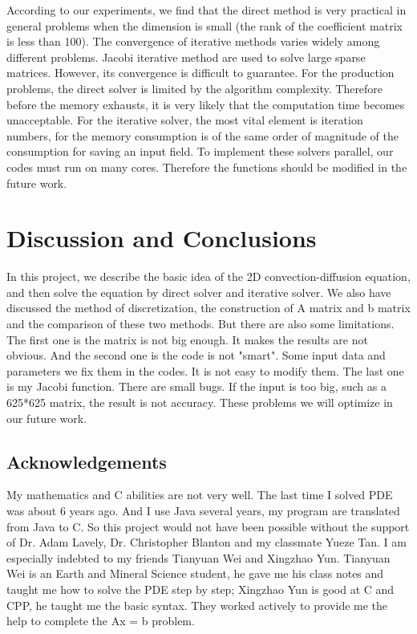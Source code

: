 \documentclass{article}
\begin{document}
\begin{spacing}{1.1}
\begin{itemize}
    According to our experiments, we find that the direct method is very practical in general problems when the dimension is small (the rank of the coefficient matrix is less than 100). The convergence of iterative methods varies widely among different problems. Jacobi iterative method are used to solve large sparse matrices. However, its convergence is difficult to guarantee.\newline
    For the production problems, the direct solver is limited by the algorithm complexity. Therefore before the memory exhausts, it is very likely that the computation time becomes unacceptable. For the iterative solver, the most vital element is iteration numbers, for the memory consumption is of the same order of magnitude of the consumption for saving an input field. To implement these solvers parallel, our codes must run on many cores. Therefore the functions should be modified in the future work.
\end{itemize}

\section{Discussion and Conclusions}

\begin{enumerate}
    In this project, we describe the basic idea of the 2D convection-diffusion equation, and then solve the equation by direct solver and iterative solver. We also have discussed the method of discretization, the construction of A matrix and b matrix and the comparison of these two methods.\newline
    But there are also some limitations. The first one is the matrix is not big enough. It makes the results are not obvious. And the second one is the code is not "smart". Some input data and parameters we fix them in the codes. It is not easy to modify them. The last one is my Jacobi function. There are small bugs. If the input is too big, such as a 625*625 matrix, the result is not accuracy. These problems we will optimize in our future work.  
\end{enumerate}

\newpage
\begin{appendices}

\section{Acknowledgements}
My mathematics and C abilities are not very well. The last time I solved PDE was about 6 years ago. And I use Java several years, my program are translated from Java to C. So this project would not have been possible without the support of Dr. Adam Lavely, Dr. Christopher Blanton and my classmate Yueze Tan. I am especially indebted to my friends Tianyuan Wei and Xingzhao Yun. Tianyuan Wei is an Earth and Mineral Science student, he gave me his class notes and taught me how to solve the PDE step by step; Xingzhao Yun is good at C and CPP, he taught me the basic syntax. They worked actively to provide me the help to complete the Ax = b problem.


\end{appendices}
\end{spacing}
\end{document}

